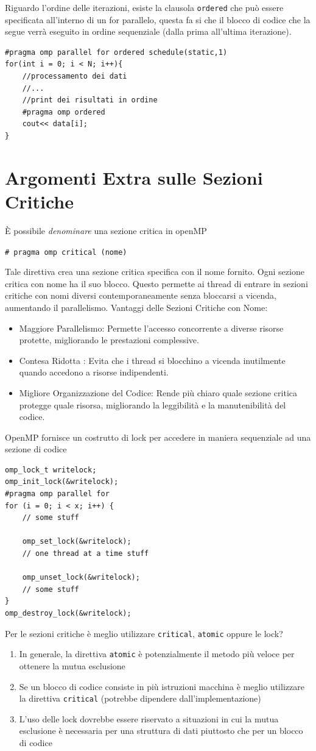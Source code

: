 \documentclass[10pt, letterpaper]{report}
\begin{document}
Riguardo l'ordine delle iterazioni, esiste la clausola \texttt{ordered} che può essere specificata all'interno di un for parallelo, questa fa si che il blocco di codice che la segue verrà eseguito in ordine sequenziale (dalla prima all'ultima iterazione).
\begin{lstlisting}[style=CStyle]
#pragma omp parallel for ordered schedule(static,1)
for(int i = 0; i < N; i++){
    //processamento dei dati 
    //...
    //print dei risultati in ordine 
    #pragma omp ordered 
    cout<< data[i];
}
\end{lstlisting}
\flowerLine
\section{Argomenti Extra sulle Sezioni Critiche}
È possibile \textit{denominare} una sezione critica in openMP\begin{center}
    \texttt{\# pragma omp critical (nome)}
\end{center}
Tale direttiva crea una sezione critica specifica con il nome fornito. Ogni sezione critica con nome ha il suo blocco. Questo permette ai thread di entrare in sezioni critiche con nomi diversi contemporaneamente senza bloccarsi a vicenda, aumentando il parallelismo.\acc 
Vantaggi delle Sezioni Critiche con Nome:\begin{itemize}
\item Maggiore Parallelismo: Permette l'accesso concorrente a diverse risorse protette, migliorando le prestazioni complessive.
\item Contesa Ridotta : Evita che i thread si blocchino a vicenda inutilmente quando accedono a risorse indipendenti.
\item  Migliore Organizzazione del Codice: Rende più chiaro quale sezione critica protegge quale risorsa, migliorando la leggibilità e la manutenibilità del codice.
\end{itemize}
OpenMP fornisce un costrutto di lock per accedere in maniera sequenziale ad una sezione di codice
\begin{lstlisting}[style=CStyle]
omp_lock_t writelock;
omp_init_lock(&writelock);
#pragma omp parallel for
for (i = 0; i < x; i++) {
    // some stuff

    omp_set_lock(&writelock);
    // one thread at a time stuff

    omp_unset_lock(&writelock);
    // some stuff
}
omp_destroy_lock(&writelock);
\end{lstlisting}
Per le sezioni critiche è meglio utilizzare \texttt{critical}, \texttt{atomic} oppure le lock?\begin{enumerate}
    \item  In generale, la direttiva \texttt{atomic} è potenzialmente il metodo più veloce per ottenere la
    mutua esclusione
    \item Se un blocco di codice consiste in più istruzioni macchina è meglio utilizzare la direttiva \texttt{critical} (potrebbe dipendere dall'implementazione)
    \item  L'uso delle lock dovrebbe essere riservato a situazioni in cui la mutua
    esclusione è necessaria per una struttura di dati piuttosto che per un blocco di codice 
\end{enumerate}
\end{document}
